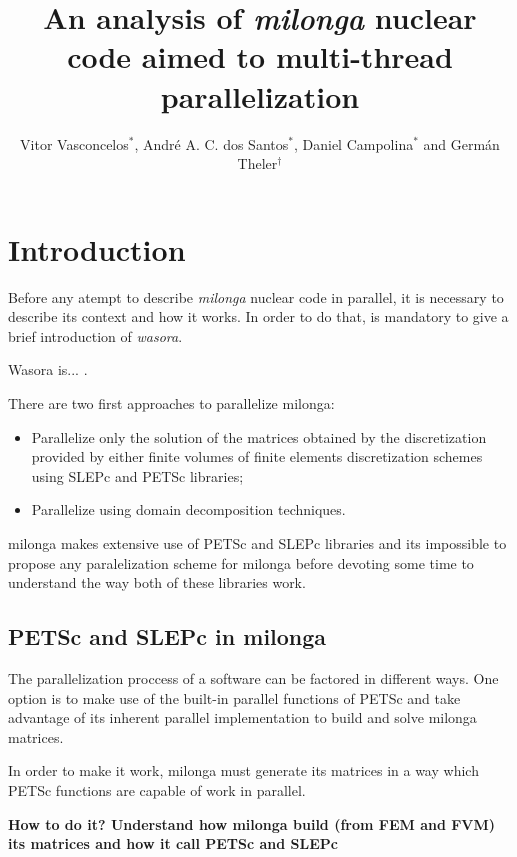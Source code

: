 \documentclass{anstrans}
\title{An analysis of \textit{milonga} nuclear code aimed to multi-thread parallelization}
\author{Vitor Vasconcelos$^{*}$, Andr\'e A. C. dos Santos$^{*}$, Daniel Campolina$^{*}$ and Germ\'an Theler$^{\dagger}$}
\institute{
$^{*}$Centro de Desenvolvimento da Tecnologia Nuclear, CEP 31270-901,
Belo Horizonte - MG, Brazil
\and
$^{\dagger}$Seamplex, Rafaela, Argentina
}
\begin{document}
\vspace*{-42pt}
\begin{strip}
\vspace*{14pt}
\end{strip}


\section{Introduction}

Before any atempt to describe \textit{milonga} nuclear code in parallel, it is
necessary to describe its context and how it works. In order to do that, is mandatory
to give a brief introduction of \textit{wasora}.

Wasora is... \cite{wasora}.

There are two first approaches to parallelize milonga:
\begin{itemize}
\item Parallelize only the solution of the matrices obtained by the discretization
  provided by either finite volumes of finite elements discretization schemes using
  SLEPc and PETSc libraries;
\item Parallelize using domain decomposition techniques.
\end{itemize}

milonga makes extensive use of PETSc \cite{petsc} and SLEPc \cite{Hernandez2005} libraries and
its impossible to propose any paralelization scheme for milonga before devoting some
time to understand the way both of these libraries work.

\subsection{PETSc and SLEPc in milonga}
The parallelization proccess of a software can be factored in different ways. 
One option is to make use of the built-in parallel functions of PETSc and take 
advantage of its inherent parallel implementation to build and solve milonga 
matrices.

In order to make it work, milonga must generate its matrices in a way which PETSc 
functions are capable of work in parallel.

\textbf{How to do it? Understand how milonga build (from FEM and FVM) its matrices 
and how it call PETSc and SLEPc}
\end{document}
